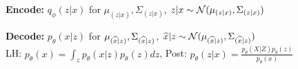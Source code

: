 \textbf{Encode:} $q_\phi(z|x)$ for $\mu_{(z|x)}, \Sigma_{(z|x)}$, $z|x \sim \mathcal{N}(\mu_{(z|x)}, \Sigma_{(z|x)})$\\

\textbf{Decode:} $p_{\theta}(x|z)$ for $\mu_{(\widehat{x}|z)}, \Sigma_{(\widehat{x}|z)}$, $\widehat{x}|z \sim \mathcal{N}(\mu_{(\widehat{x}|z)}, \Sigma_{(\widehat{x}|z)})$\\
LH: $p_\theta(x) = \int_z p_\theta(x|z) p_\theta(z) dz$, Post: $p_\theta(z|x) = \frac{p_\theta(X|Z) p_\theta(z)}{p_\theta(x)}$\\

